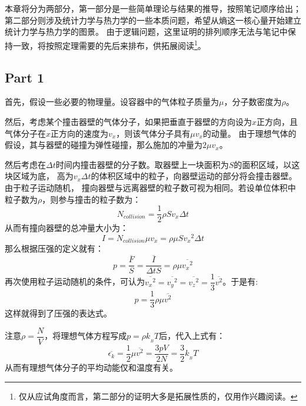    \chapter[热力学]{}
        本章将分为两部分，第一部分是一些简单理论与结果的推导，按照笔记顺序给出；
        第二部分则涉及统计力学与热力学的一些本质问题，希望从熵这一核心量开始建立统计力学与热力学的图景。
        由于逻辑问题，这里证明的排列顺序无法与笔记中保持一致，将按照定理需要的先后来排布，供拓展阅读\footnote{仅从应试角度而言，第二部分的证明大多是拓展性质的，仅用作兴趣阅读。}。
        \section{Part 1}
        \begin{prove}
            首先，假设一些必要的物理量。设容器中的气体粒子质量为$\mu$，分子数密度为$\rho$。

            然后，考虑某个撞击器壁的气体分子，如果把垂直于器壁的方向设为$x$正方向，且气体分子在$x$正方向的速度为$v_x$，则该气体分子具有$\mu v_x$的动量。
            由于理想气体的假设，其与器壁的碰撞为弹性碰撞，那么施加的冲量为$2\mu v_x$。

            然后考虑在$\Delta t$时间内撞击器壁的分子数。取器壁上一块面积为$S$的面积区域，以这块区域为底，
            高为$v_x \Delta t$的体积区域中的粒子，向器壁运动的部分将会撞击器壁。由于粒子运动随机，
            撞向器壁与远离器壁的粒子数可视为相同。若设单位体积中粒子数为$\rho$，则参与撞击的粒子数为：
            \begin{equation*}
                N_{collision} = \frac{1}{2} \rho S v_x \Delta t
            \end{equation*}
            从而有撞向器壁的总冲量大小为：
            \begin{equation}
                I = N_{collision} \mu v_x = \rho \mu S v_{x}{}^{2} \Delta t
                \nonumber
            \end{equation}
            那么根据压强的定义就有：
            \begin{equation}
                p = \frac{\overline{F}}{S} = \frac{\overline{I}}{\Delta tS} = \rho \mu \overline{v_{x}{}^{2}}
                \nonumber
            \end{equation}                                                                      
            再次使用粒子运动随机的条件，可认为$\overline{v_x{}^2}=\overline{v_y{}^2}=\overline{v_z{}^2}=\dfrac{1}{3}\overline{v^2}$。于是有:
            \begin{equation}
                p = \frac{1}{3}\rho \mu \overline{v^{2}}
            \end{equation}          
            这样就得到了压强的表达式。

            注意$\rho = \dfrac{N}{V}$，将理想气体方程写成$p = \rho k_{_B}T$后，代入上式有：
            \begin{equation}
                \overline{\epsilon_k} = \frac{1}{2}\mu \overline{v^{2}}  = \frac{3pV}{2N} = \frac{3}{2} k_{_B}T  
            \end{equation}
            从而有理想气体分子的平均动能仅和温度有关。
        \end{prove}
